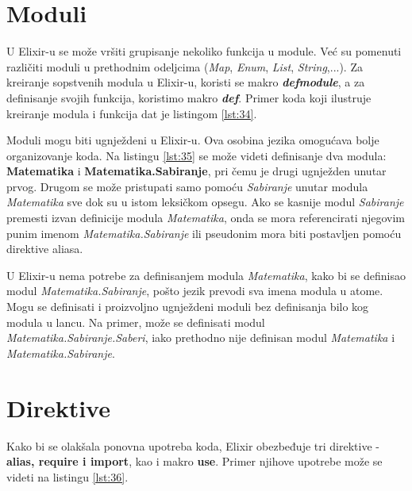 \documentclass[12pt,oneside]{memoir}
\begin{document}
\section{Moduli}

U Elixir-u se može vršiti grupisanje nekoliko funkcija u module. Već su pomenuti različiti moduli u prethodnim odeljcima (\textit{Map}, \textit{Enum}, \textit{List}, \textit{String},...). Za kreiranje sopstvenih modula u Elixir-u, koristi se makro \textbf{\textit{defmodule}}, a za definisanje svojih funkcija, koristimo makro \textbf{\textit{def}}. Primer koda koji ilustruje kreiranje modula i funkcija dat je listingom \ref{lst:34}.



Moduli mogu biti ugnježdeni u Elixir-u. Ova osobina jezika omogućava bolje organizovanje koda. Na listingu \ref{lst:35} se može videti definisanje dva modula: \textbf{Matematika} i \textbf{Matematika.Sabiranje}, pri čemu je drugi ugnježden unutar prvog. Drugom se može pristupati samo pomoću \textit{Sabiranje} unutar modula \textit{Matematika} sve dok su u istom leksičkom opsegu. Ako se kasnije modul \textit{Sabiranje} premesti izvan definicije modula \textit{Matematika}, onda se mora referencirati njegovim punim imenom \textit{Matematika.Sabiranje} ili pseudonim mora biti postavljen pomoću direktive aliasa.

\newpage



\noindent U Elixir-u nema potrebe za definisanjem modula \textit{Matematika}, kako bi se definisao modul \textit{Matematika.Sabiranje}, pošto jezik prevodi sva imena modula u atome. Mogu se  definisati i proizvoljno ugnježdeni moduli bez definisanja bilo kog modula u lancu. Na primer, može se definisati modul \textit{Matematika.Sabiranje.Saberi}, iako  prethodno nije definisan modul \textit{Matematika} i \textit{Matematika.Sabiranje}.

\section{Direktive}

Kako bi se olakšala ponovna upotreba koda, Elixir obezbeđuje tri direktive - \textbf{alias, require i import}, kao i makro \textbf{use}. Primer njihove upotrebe može se videti na listingu \ref{lst:36}.
\end{document}
